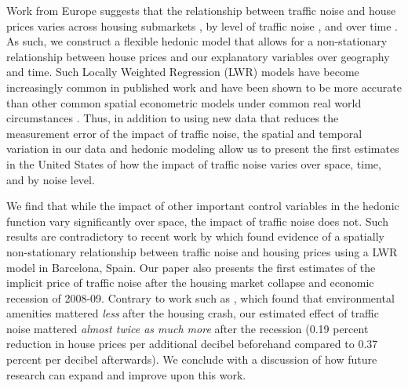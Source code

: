 \documentclass{article}\usepackage{graphicx, color}
\begin{document}

Work from Europe suggests that the relationship between traffic noise and house prices varies across housing submarkets \citep{Day2007, MarmolejoDuarteCarlos;GonzalezTamez2009}, by level of traffic noise \citep{Theebe2004a, Brandt2011}, and over time \cite{Wilhelmsson2000}. As such, we construct a flexible hedonic model that allows for a non-stationary relationship between house prices and our explanatory variables over geography and time. Such Locally Weighted Regression (LWR) models have become increasingly common in published work \citep[see][]{MarmolejoDuarteCarlos;GonzalezTamez2009, Carruthers2010, Sunding2010, Nappi-Choulet2011} and have been shown to be more accurate than other common spatial econometric models under common real world circumstances \citep{McMillen2012}. Thus, in addition to using new data that reduces the measurement error of the impact of traffic noise, the spatial and temporal variation in our data and hedonic modeling allow us to present the first estimates in the United States of how the impact of traffic noise varies over space, time, and by noise level. 

We find that while the impact of other important control variables in the hedonic function vary significantly over space, the impact of traffic noise does not. Such results are contradictory to recent work by \citet{MarmolejoDuarteCarlos;GonzalezTamez2009} which found evidence of a spatially non-stationary relationship between traffic noise and housing prices using a LWR model in Barcelona, Spain. Our paper also presents the first estimates of the implicit price of traffic noise after the housing market collapse and economic recession of 2008-09. Contrary to work such as \citet{Cho2011b}, which found that environmental amenities mattered \emph{less} after the housing crash, our estimated effect of traffic noise mattered \emph{almost twice as much more} after the recession (0.19 percent reduction in house prices per additional decibel beforehand compared to 0.37 percent per decibel afterwards). We conclude with a discussion of how future research can expand and improve upon this work.
 
\end{document}
